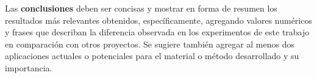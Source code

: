 \justify
Las \textbf{conclusiones} deben ser concisas y mostrar en forma de resumen los resultados más relevantes obtenidos, específicamente, agregando valores numéricos y frases que describan la diferencia observada en los experimentos de este trabajo en comparación con otros proyectos. Se sugiere también agregar al menos dos aplicaciones actuales o potenciales para el material o método desarrollado
y su importancia.




